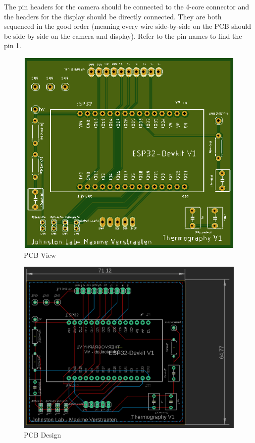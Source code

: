 \documentclass[a4paper]{article}
\begin{document}
The pin headers for the camera should be connected to the 4-core connector and the headers for the display should be directly connected. They are both sequenced in the good order (meaning every wire side-by-side on the PCB should be side-by-side on the camera and display). Refer to the pin names to find the pin 1.
\begin{figure}[h!]
    \centering
    \includegraphics[width = 12cm]{images/PCBViewer.png}
    \caption{PCB View}
    \label{fig:PCBView}
\end{figure}

\begin{figure}[h!]
    \centering
    \includegraphics[width = 12cm]{images/BoardView.PNG}
    \caption{PCB Design}
    \label{fig:BoardView}
\end{figure}
\end{document}
